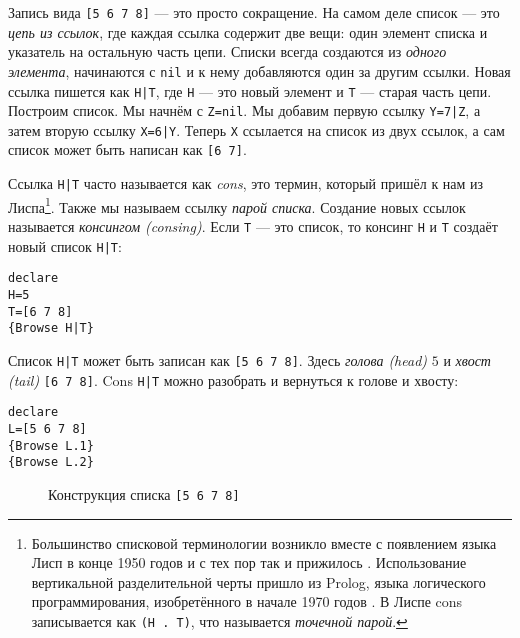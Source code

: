 Запись вида \lstinline|[5 6 7 8]| --- это просто сокращение. На самом деле список --- это \emph{цепь из ссылок}, где каждая ссылка содержит две вещи: один элемент списка и указатель на остальную часть цепи. Списки всегда создаются из \emph{одного элемента}, начинаются с \lstinline|nil| и к нему добавляются один за другим ссылки. Новая ссылка пишется как \lstinline!H|T!, где \lstinline|H| --- это новый элемент и \lstinline|T| --- старая часть цепи. Построим список. Мы начнём с \lstinline|Z=nil|. Мы добавим первую ссылку \lstinline!Y=7|Z!, а затем вторую ссылку \lstinline!X=6|Y!. Теперь \lstinline|X| ссылается на список из двух ссылок, а сам список может быть написан как \lstinline|[6 7]|.

Ссылка \lstinline!H|T! часто называется как \emph{cons}, это термин, который пришёл к нам из Лиспа\footnote{Большинство списковой терминологии возникло вместе с появлением языка Лисп в конце 1950 годов и с тех пор так и прижилось \cite{120}. Использование вертикальной разделительной черты пришло из Prolog, языка логического программирования, изобретённого в начале 1970 годов \cite{40, 182}. В Лиспе cons записывается как \lstinline|(H . T)|, что называется \emph{точечной парой}.}. Также мы называем ссылку \emph{парой списка}. Создание новых ссылок называется \emph{консингом (consing)}. Если \lstinline|T| --- это список, то консинг \lstinline|H| и \lstinline|T| создаёт новый список \lstinline!H|T!:



\begin{lstlisting}
declare
H=5
T=[6 7 8]
{Browse H|T}
\end{lstlisting}

Список \lstinline!H|T! может быть записан как \lstinline|[5 6 7 8]|. Здесь \emph{голова (head)} $5$ и \emph{хвост (tail)} \lstinline|[6 7 8]|. Cons \lstinline!H|T! можно разобрать и вернуться к голове и хвосту:

\begin{lstlisting}
declare
L=[5 6 7 8]
{Browse L.1}
{Browse L.2}
\end{lstlisting}

\begin{figure}[h]
  \caption{Конструкция списка \lstinline|[5 6 7 8]|}
  \label{figure:list_construction}
\end{figure}

